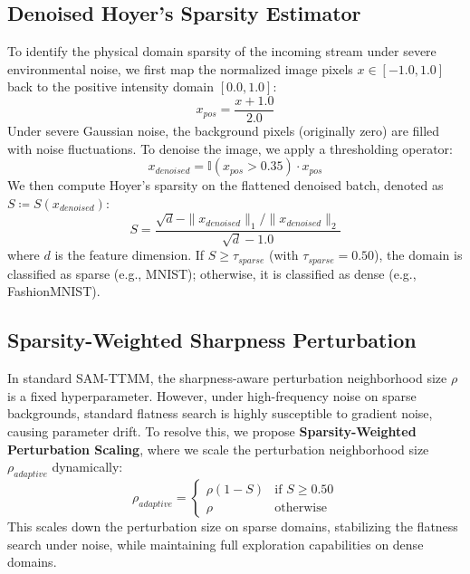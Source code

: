 \documentclass{article}
\theoremstyle{plain}
\theoremstyle{definition}
\theoremstyle{remark}
\begin{document}
\subsection{Denoised Hoyer's Sparsity Estimator}
To identify the physical domain sparsity of the incoming stream under severe environmental noise, we first map the normalized image pixels $x \in [-1.0, 1.0]$ back to the positive intensity domain $[0.0, 1.0]$:
\begin{equation}
  x_{pos} = \frac{x + 1.0}{2.0}
\end{equation}
Under severe Gaussian noise, the background pixels (originally zero) are filled with noise fluctuations. To denoise the image, we apply a thresholding operator:
\begin{equation}
  x_{denoised} = \mathbb{I}(x_{pos} > 0.35) \cdot x_{pos}
\end{equation}
We then compute Hoyer's sparsity \cite{detry2022hoyer} on the flattened denoised batch, denoted as $S \coloneqq S(x_{denoised})$:
\begin{equation}
  S = \frac{\sqrt{d} - \|x_{denoised}\|_1 / \|x_{denoised}\|_2}{\sqrt{d} - 1.0}
\end{equation}
where $d$ is the feature dimension. If $S \ge \tau_{sparse}$ (with $\tau_{sparse} = 0.50$), the domain is classified as sparse (e.g., MNIST); otherwise, it is classified as dense (e.g., FashionMNIST).

\subsection{Sparsity-Weighted Sharpness Perturbation}
In standard SAM-TTMM, the sharpness-aware perturbation neighborhood size $\rho$ is a fixed hyperparameter. However, under high-frequency noise on sparse backgrounds, standard flatness search is highly susceptible to gradient noise, causing parameter drift. To resolve this, we propose \textbf{Sparsity-Weighted Perturbation Scaling}, where we scale the perturbation neighborhood size $\rho_{adaptive}$ dynamically:
\begin{equation}
  \rho_{adaptive} =
  \begin{cases}
    \rho (1 - S) & \text{if } S \ge 0.50 \\
    \rho         & \text{otherwise}
  \end{cases}
\end{equation}
This scales down the perturbation size on sparse domains, stabilizing the flatness search under noise, while maintaining full exploration capabilities on dense domains.
\end{document}
